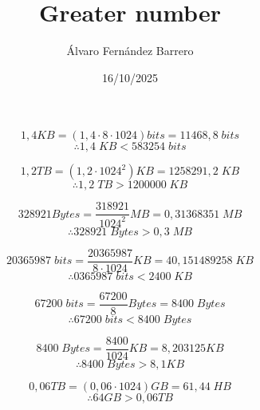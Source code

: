 \documentclass[12pt]{article}
\title{Greater number}
\author{Álvaro Fernández Barrero}
\date{16/10/2025}
\begin{document}
\maketitle

\[
     1,4 KB = (1,4 \cdot 8 \cdot 1024) bits = 11468,8 \; bits
\]
\[
    \therefore 1,4 \; KB < 583254 \; bits
\]

\[
    1,2 TB = (1,2 \cdot 1024^2)KB = 1258291,2 \; KB
\]
\[
    \therefore 1,2 \; TB > 1200000 \; KB
\]

\[
    328921 Bytes = \frac{318921}{1024^2}MB = 0,31368351 \; MB
\]
\[
    \therefore 328921 \; Bytes > 0,3 \; MB
\]

\[
    20365987 \; bits = \frac{20365987}{8 \cdot 1024}KB = 40,151489258 \; KB
\]
\[
    \therefore 0365987 \; bits < 2400 \; KB
\]

\[
   67200 \; bits = \frac{67200}{8} Bytes =  8400 \; Bytes
\] 
\[
    \therefore 67200 \; bits < 8400 \; Bytes
\]

\[
    8400 \; Bytes = \frac{8400}{1024}KB = 8,203125KB
\]
\[
    \therefore  8400 \; Bytes > 8,1 KB
\]

\[
    0,06 TB = (0,06 \cdot 1024) GB = 61,44 \; HB
\]
\[
    \therefore 64 GB > 0,06 TB
\]
\end{document}
